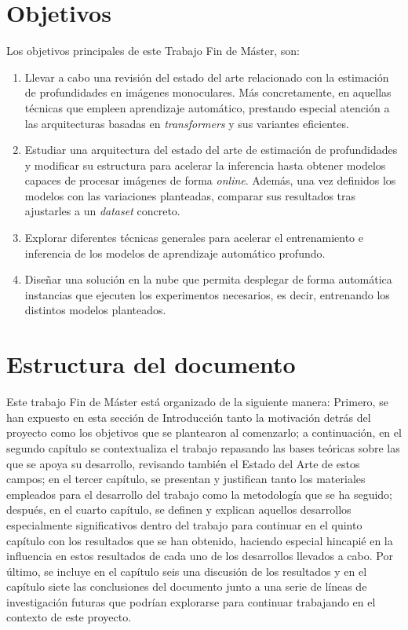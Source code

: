 \section{Objetivos}
Los objetivos principales de este Trabajo Fin de Máster, son:
\begin{enumerate}
	\item Llevar a cabo una revisión del estado del arte relacionado con la estimación de profundidades en imágenes monoculares. Más concretamente, en aquellas técnicas que empleen aprendizaje automático, prestando especial atención a las arquitecturas basadas en \textit{transformers} y sus variantes eficientes.
    \item Estudiar una arquitectura del estado del arte de estimación de profundidades y modificar su estructura para acelerar la inferencia hasta obtener modelos capaces de procesar imágenes de forma \textit{online}. Además, una vez definidos los modelos con las variaciones planteadas, comparar sus resultados tras ajustarles a un \textit{dataset} concreto.
    \item Explorar diferentes técnicas generales para acelerar el entrenamiento e inferencia de los modelos de aprendizaje automático profundo. 
    \item Diseñar una solución en la nube que permita desplegar de forma automática instancias que ejecuten los experimentos necesarios, es decir, entrenando los distintos modelos planteados.
\end{enumerate}


\section{Estructura del documento}
Este trabajo Fin de Máster está organizado de la siguiente manera: Primero, se han expuesto en esta sección de Introducción tanto la motivación detrás del proyecto como los objetivos que se plantearon al comenzarlo; a continuación, en el segundo capítulo se contextualiza el trabajo repasando las bases teóricas sobre las que se apoya su desarrollo, revisando también el Estado del Arte de estos campos; en el tercer capítulo, se presentan y justifican tanto los materiales empleados para el desarrollo del trabajo como la metodología que se ha seguido; después, en el cuarto capítulo, se definen y explican aquellos desarrollos especialmente significativos dentro del trabajo para continuar en el quinto capítulo con los resultados que se han obtenido, haciendo especial hincapié en la influencia en estos resultados de cada uno de los desarrollos llevados a cabo. Por último, se incluye en el capítulo seis una discusión de los resultados y en el capítulo siete las conclusiones del documento junto a una serie de líneas de investigación futuras que podrían explorarse para continuar trabajando en el contexto de este proyecto. 


\clearpage
